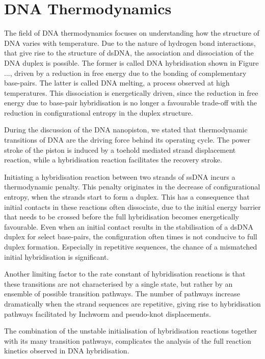 \section{DNA Thermodynamics}

 The field of DNA thermodynamics focuses on understanding how the structure of DNA varies
with temperature. Due to the nature of hydrogen bond interactions, that give rise to the
structure of dsDNA, the association and dissociation of the DNA duplex is possible. The
former is called DNA hybridisation shown in Figure ..., driven by a reduction in free
energy due to the bonding of complementary base-pairs. The latter is called DNA
melting, a process observed at high temperatures. This dissociation is
energetically driven, since the reduction in free energy due to base-pair hybridisation
is no longer a favourable trade-off with the reduction in configurational entropy in the
duplex structure.

During the discussion of the DNA nanopiston, we stated that thermodynamic transitions of
DNA are the driving force behind its operating cycle. The power stroke of the piston is
induced by a toehold mediated strand displacement reaction, while a hybridisation
reaction facilitates the recovery stroke.

Initiating a hybridisation reaction between two strands of ssDNA incurs a thermodynamic
penalty. This penalty originates in the decrease of configurational entropy, when the
strands start to form a duplex. This has a consequence that initial contacts in these
reactions often dissociate, due to the initial energy barrier that needs to be crossed
before the full hybridisation becomes energetically favourable. Even when an initial
contact
results in the stabilisation of a dsDNA duplex for select base-pairs, the configuration
often times is not conducive to full duplex formation. Especially in repetitive
sequences, the chance of a mismatched initial hybridisation is significant.

Another limiting factor to the rate constant of hybridisation reactions is that these
transitions are not characterised by a single state, but rather by an ensemble of
possible transition pathways. The number of pathways increase dramatically when the
strand sequences are repetitive, giving rise to hybridisation pathways facilitated by
Inchworm and pseudo-knot displacements\cite{Ouldridge2013}.

The combination of the unstable initialisation of hybridisation reactions together
with its many transition pathways, complicates the analysis of the full reaction kinetics
observed in DNA hybridisation.


